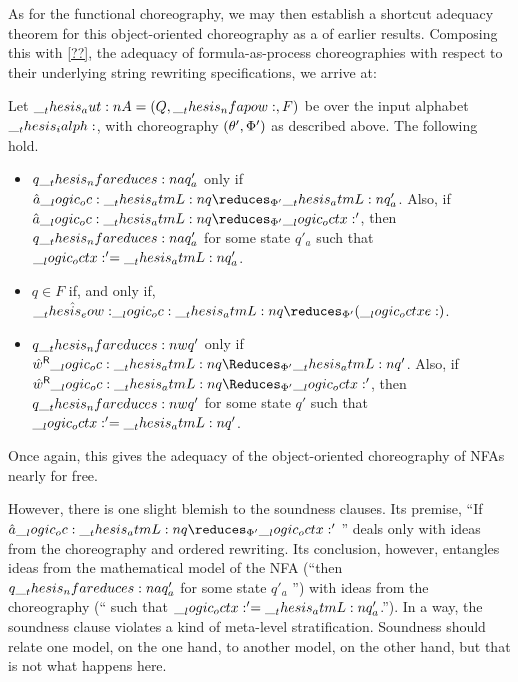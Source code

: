 As for the functional choreography, we may then establish a shortcut adequacy theorem for this object-oriented choreography as a  of earlier results.
Composing this  with \cref{??}, the adequacy of formula-as-process choreographies with respect to their underlying string rewriting specifications, we arrive at:
\begin{corollary}\label{cor:formula-as-process:nfa-oochor-adequacy}
  Let $\__thesis_aut:n {A} = (Q, \__thesis_nfapow:, F)$ be  over the input alphabet $\__thesis_ialph:$, with choreography $(\theta', \Phi')$ as described above.
  The following hold.
  \begin{itemize}[nosep]
  \item
    $q \nfareduces[a] q'_a$ only if $\defp{a} \oc \atmL{q} \reduces_{\orsig'} \atmL{q}'_a$.
    Also, if $\defp{a} \oc \atmL{q} \reduces_{\orsig'} \octx'$, then $q \nfareduces[a] q'_a$ for some state $q'_a$ such that $\__logic_octx:' = \__thesis_atmL:n {q}'_a$.
  \item
    $q \in F$ if, and only if, $\defp{\eow} \oc \atmL{q} \reduces_{\orsig'} (\octxe)$.
  \item
    $q \nfareduces[w] q'$ only if $\rev{\defp{w}} \oc \atmL{q} \Reduces_{\orsig'} \atmL{q}'$.
    Also, if $\rev{\defp{w}} \oc \atmL{q} \Reduces_{\orsig'} \octx'$, then $q \nfareduces[w] q'$ for some state $q'$ such that $\__logic_octx:' = \__thesis_atmL:n {q}'$.
  \end{itemize}
\end{corollary}
\noindent
Once again, this gives the adequacy of the object-oriented choreography of \acp{NFA} nearly for free.

However, there is one slight blemish to the soundness clauses.
Its premise, \enquote{If $\defp{a} \oc \atmL{q} \reduces_{\orsig'} \octx'$ \textelp{}} deals only with ideas from the choreography and ordered rewriting.
Its conclusion, however, entangles ideas from the mathematical model of the \ac{NFA} (\enquote{then $q \nfareduces[a] q'_a$ for some state $q'_a$ \textelp{}}) with ideas from the choreography (\enquote{\textelp{} such that $\__logic_octx:' = \__thesis_atmL:n {q}'_a$.}).
In a way, the soundness clause violates a kind of meta-level stratification.
Soundness should relate one model, on the one hand, to another model, on the other hand, but that is not what happens here.


